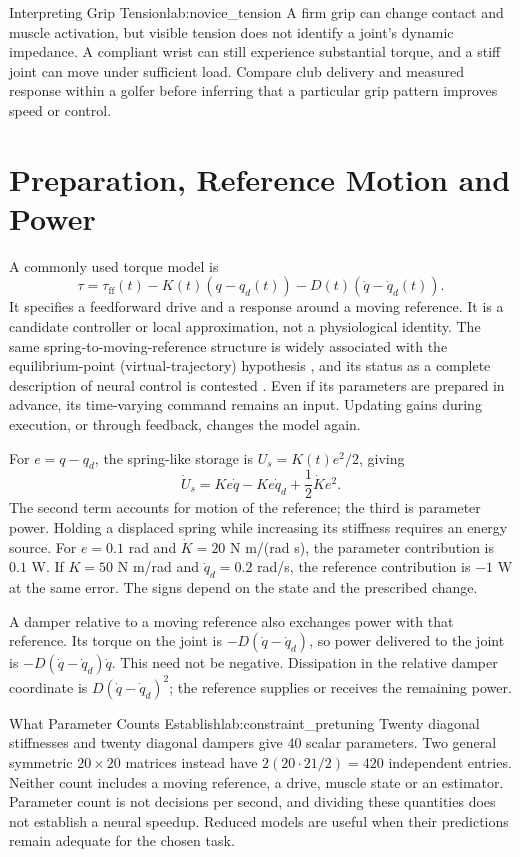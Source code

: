 \begin{laymansbox}{Interpreting Grip Tension}{lab:novice_tension}
A firm grip can change contact and muscle activation, but visible tension does not identify a joint's dynamic impedance. A compliant wrist can still experience substantial torque, and a stiff joint can move under sufficient load. Compare club delivery and measured response within a golfer before inferring that a particular grip pattern improves speed or control.
\end{laymansbox}

\section{Preparation, Reference Motion and Power}
\label{sec:pretuned}

A commonly used torque model is
\[
\tau=\tau_{\mathrm{ff}}(t)-K(t)(q-q_d(t))-D(t)(\dot q-\dot q_d(t)).
\]
It specifies a feedforward drive and a response around a moving reference. It is a candidate controller or local approximation, not a physiological identity. The same spring-to-moving-reference structure is widely associated with the equilibrium-point (virtual-trajectory) hypothesis \citep{Feldman1986,Bizzi1984}, and its status as a complete description of neural control is contested \citep{GomiKawato1996}. Even if its parameters are prepared in advance, its time-varying command remains an input. Updating gains during execution, or through feedback, changes the model again.

For $e=q-q_d$, the spring-like storage is $U_s=K(t)e^2/2$, giving
\[
\dot U_s=Ke\dot q-Ke\dot q_d+\frac12\dot K e^2.
\]
The second term accounts for motion of the reference; the third is parameter power. Holding a displaced spring while increasing its stiffness requires an energy source. For $e=0.1$ rad and $\dot K=20$ N m/(rad s), the parameter contribution is $0.1$ W. If $K=50$ N m/rad and $\dot q_d=0.2$ rad/s, the reference contribution is $-1$ W at the same error. The signs depend on the state and the prescribed change.

A damper relative to a moving reference also exchanges power with that reference. Its torque on the joint is $-D(\dot q-\dot q_d)$, so power delivered to the joint is $-D(\dot q-\dot q_d)\dot q$. This need not be negative. Dissipation in the relative damper coordinate is $D(\dot q-\dot q_d)^2$; the reference supplies or receives the remaining power.

\begin{example}{What Parameter Counts Establish}{lab:constraint_pretuning}
Twenty diagonal stiffnesses and twenty diagonal dampers give 40 scalar parameters. Two general symmetric $20\times20$ matrices instead have $2(20\cdot21/2)=420$ independent entries. Neither count includes a moving reference, a drive, muscle state or an estimator. Parameter count is not decisions per second, and dividing these quantities does not establish a neural speedup. Reduced models are useful when their predictions remain adequate for the chosen task.
\end{example}

